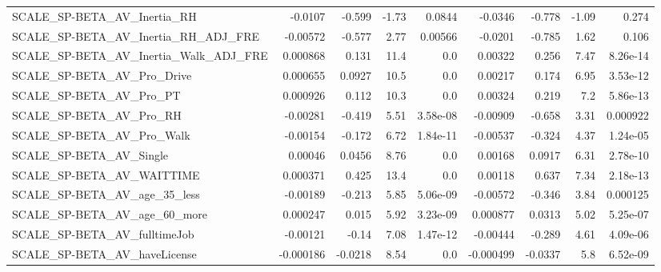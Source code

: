 \begin{tabular}{lrrrrrrrr}
SCALE\_SP-BETA\_AV\_Inertia\_RH                        &     -0.0107 &       -0.599 &    -1.73 &   0.0844 &    -0.0346 &      -0.778 &        -1.09 &         0.274 \\
SCALE\_SP-BETA\_AV\_Inertia\_RH\_ADJ\_FRE                &    -0.00572 &       -0.577 &     2.77 &  0.00566 &    -0.0201 &      -0.785 &         1.62 &         0.106 \\
SCALE\_SP-BETA\_AV\_Inertia\_Walk\_ADJ\_FRE              &    0.000868 &        0.131 &     11.4 &      0.0 &    0.00322 &       0.256 &         7.47 &      8.26e-14 \\
SCALE\_SP-BETA\_AV\_Pro\_Drive                         &    0.000655 &       0.0927 &     10.5 &      0.0 &    0.00217 &       0.174 &         6.95 &      3.53e-12 \\
SCALE\_SP-BETA\_AV\_Pro\_PT                            &    0.000926 &        0.112 &     10.3 &      0.0 &    0.00324 &       0.219 &          7.2 &      5.86e-13 \\
SCALE\_SP-BETA\_AV\_Pro\_RH                            &    -0.00281 &       -0.419 &     5.51 & 3.58e-08 &   -0.00909 &      -0.658 &         3.31 &      0.000922 \\
SCALE\_SP-BETA\_AV\_Pro\_Walk                          &    -0.00154 &       -0.172 &     6.72 & 1.84e-11 &   -0.00537 &      -0.324 &         4.37 &      1.24e-05 \\
SCALE\_SP-BETA\_AV\_Single                            &     0.00046 &       0.0456 &     8.76 &      0.0 &    0.00168 &      0.0917 &         6.31 &      2.78e-10 \\
SCALE\_SP-BETA\_AV\_WAITTIME                          &    0.000371 &        0.425 &     13.4 &      0.0 &    0.00118 &       0.637 &         7.34 &      2.18e-13 \\
SCALE\_SP-BETA\_AV\_age\_35\_less                       &    -0.00189 &       -0.213 &     5.85 & 5.06e-09 &   -0.00572 &      -0.346 &         3.84 &      0.000125 \\
SCALE\_SP-BETA\_AV\_age\_60\_more                       &    0.000247 &        0.015 &     5.92 & 3.23e-09 &   0.000877 &      0.0313 &         5.02 &      5.25e-07 \\
SCALE\_SP-BETA\_AV\_fulltimeJob                       &    -0.00121 &        -0.14 &     7.08 & 1.47e-12 &   -0.00444 &      -0.289 &         4.61 &      4.09e-06 \\
SCALE\_SP-BETA\_AV\_haveLicense                       &   -0.000186 &      -0.0218 &     8.54 &      0.0 &  -0.000499 &     -0.0337 &          5.8 &      6.52e-09 \\

\end{tabular}
